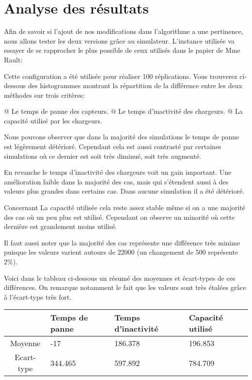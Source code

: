\documentclass[final]{polytech/polytech}
\begin{document}
	\section{Analyse des résultats}
		Afin de savoir si l'ajout de nos modifications dans l'algorithme a une pertinence, nous allons tester les deux versions grâce au simulateur.
		L'instance utilisée va essayer de se rapprocher le plus possible de ceux utilisés dans le papier de Mme Rault:
		
		Cette configuration a été utilisée pour réaliser 100 réplications.
		Vous trouverez ci-dessous des histogrammes montrant la répartition de la différence entre les deux méthodes sur trois critères:
		\begin{easylist}
			@ Le temps de panne des capteurs.
			@ Le temps d'inactivité des chargeurs.
			@ La capacité utilisé par les chargeurs.
		\end{easylist}
		
		Nous pouvons observer que dans la majorité des simulations le temps de panne est légèrement détérioré.
		Cependant cela est aussi contrasté par certaines simulations où ce dernier est soit très diminué, soit très augmenté.
		
		En revanche le temps d'inactivité des chargeurs voit un gain important.
		Une amélioration faible dans la majorité des cas, mais qui s'étendent aussi à des valeurs plus grandes dans certains cas.
		Dans aucune simulation il a été détérioré.
		
		Concernant La capacité utilisée cela reste assez stable même si on a une majorité des cas où un peu plus est utilisé.
		Cependant on observe un minorité où cette dernière est grandement moins utilisé.
		
		Il faut aussi noter que la majorité des cas représente une différence très minime puisque les valeurs varient autours de 22000 (un changement de 500 représente 2\%).
		
		Voici dans le tableau ci-dessous un résumé des moyennes et écart-types de ces différences.
		On remarque notamment le fait que les valeurs sont très étalées grâce à l'écart-type très fort.
		\begin{tabularx}{\textwidth}{|c|X|X|X|}
			\hline
			& Temps de panne & Temps d'inactivité & Capacité utilisé\\\hline
			Moyenne & -17 & 186.378 & 196.853\\\hline
			Ecart-type & 344.465 & 597.892 & 784.709\\\hline
		\end{tabularx}
		
\end{document}
